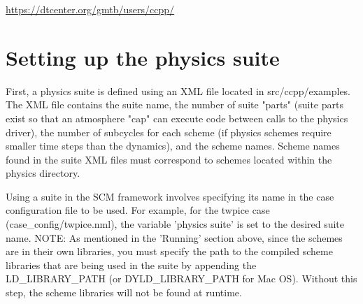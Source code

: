 \url{https://dtcenter.org/gmtb/users/ccpp/}


\section{Setting up the physics suite}
First, a physics suite is defined using an XML file located in
src/ccpp/examples. The XML file contains the suite name, the number of suite
"parts" (suite parts exist so that an atmosphere "cap" can execute code between
calls to the physics driver), the number of subcycles for each scheme (if
physics schemes require smaller time steps than the dynamics), and the scheme
names. Scheme names found in the suite XML files must correspond to schemes
located within the physics directory.

Using a suite in the SCM framework involves specifying its name in the case
configuration file to be used. For example, for the twpice case
(case\_config/twpice.nml), the variable 'physics suite' is set to the desired
suite name. NOTE: As mentioned in the 'Running' section above, since the schemes
 are in their own libraries, you must specify the path to the compiled scheme
 libraries that are being used in the suite by appending the LD\_LIBRARY\_PATH
 (or DYLD\_LIBRARY\_PATH for Mac OS). Without this step, the scheme libraries will
  not be found at runtime.


